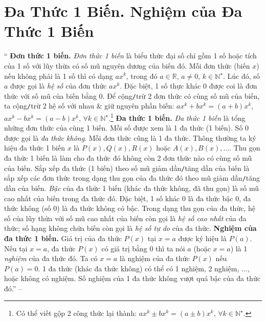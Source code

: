 \documentclass{article}
\numberwithin{equation}{section}
\begin{document}
\section{Đa Thức 1 Biến. Nghiệm của Đa Thức 1 Biến}
`` \textbf{Đơn thức 1 biến.} \textit{Đơn thức 1 biến} là biểu thức đại số chỉ gồm 1 số hoặc tích của 1 số với lũy thừa có số mũ nguyên dương của biến đó. Mỗi đơn thức (biến $x$) nếu không phải là 1 số thì có dạng $ax^k$, trong đó $a\in\mathbb{R}$, $a\ne0$, $k\in\mathbb{N}^\star$. Lúc đó, số $a$ được gọi là \textit{hệ số} của đơn thức $ax^k$. Đặc biệt, 1 số thực khác $0$ được coi là đơn thức với số mũ của biến bằng $0$. Để cộng\texttt{/}trừ 2 đơn thức có cùng số mũ của biến, ta cộng\texttt{/}trừ 2 hệ số với nhau \& giữ nguyên phần biến: $ax^k + bx^k = (a + b)x^k$, $ax^k - bx^k = (a - b)x^k$, $\forall k\in\mathbb{N}^\star$.\footnote{Có thể viết gộp 2 công thức lại thành: $ax^k\pm bx^k = (a\pm b)x^k$, $\forall k\in\mathbb{N}^\star$.}  \textbf{Đa thức 1 biến.} \textit{Đa thức 1 biến} là tổng những đơn thức của cùng 1 biến. Mỗi số được xem là 1 đa thức (1 biến). Số $0$ được gọi là \textit{đa thức không}. Mỗi đơn thức cũng là 1 đa thức. Thông thường ta ký hiệu đa thức 1 biến $x$ là $P(x),Q(x),R(x)$ hoặc $A(x),B(x),\ldots$. Thu gọn đa thức 1 biến là làm cho đa thức đó không còn 2 đơn thức nào có cùng số mũ của biến. Sắp xếp đa thức (1 biến) theo số mũ giảm dần\texttt{/}tăng dần của biến là sắp xếp các đơn thức trong dạng thu gọn của đa thức đó theo mũ giảm dần\texttt{/}tăng dần của biến. \textit{Bậc} của đa thức 1 biến (khác đa thức không, đã thu gọn) là số mũ cao nhất của biến trong đa thức đó. Đặc biệt, 1 số khác 0 là đa thức bậc 0, đa thức không (số 0) là đa thức không có bậc. Trong dạng thu gọn của đa thức, hệ số của lũy thừa với số mũ cao nhất của biến còn gọi là \textit{hệ số cao nhất} của đa thức; số hạng không chứa biến còn gọi là \textit{hệ số tự do} của đa thức.  \textbf{Nghiệm của đa thức 1 biến.} Giá trị của đa thức $P(x)$ tại $x = a$ được ký hiệu là $P(a)$. Nếu tại $x = a$, đa thức $P(x)$ có giá trị bằng $0$ thì ta nói $a$ (hoặc $x = a$) là 1 \textit{nghiệm} của đa thức đó. Ta có $x = a$ là nghiệm của đa thức $P(x)$ nếu $P(a) = 0$. 1 đa thức (khác đa thức không) có thể có 1 nghiệm, 2 nghiệm, $\ldots$, hoặc không có nghiệm. Số nghiệm của 1 đa thức không vượt quá bậc của đa thức đó.'' -- \cite[Chap. VI, \S2, pp. 40--41]{SBT_Toan_7_Canh_Dieu_tap_2}
\end{document}
